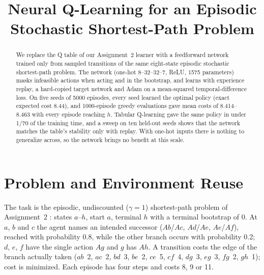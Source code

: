 \documentclass[conference]{IEEEtran}
\begin{document}
\title{Neural Q-Learning for an Episodic\\Stochastic Shortest-Path Problem}

\author{
}

\maketitle

\begin{abstract}
We replace the Q table of our Assignment~2 learner with a feedforward network trained only
from sampled transitions of the same eight-state episodic stochastic shortest-path problem.
The network (one-hot 8--32--32--7, ReLU, 1575 parameters) masks infeasible actions when acting
and in the bootstrap, and learns with experience replay, a hard-copied target network and Adam
on a mean-squared temporal-difference loss. On five seeds of 5000 episodes, every seed learned
the optimal policy (exact expected cost 8.44), and 1000-episode greedy evaluations gave mean
costs of 8.414--8.463 with every episode reaching $h$. Tabular Q-learning gave the same policy
in under 1/70 of the training time, and a sweep on ten held-out seeds shows that the network matches
the table's stability only with replay. With one-hot inputs there is nothing to generalize
across, so the network brings no benefit at this scale.
\end{abstract}

\section{Problem and Environment Reuse}
The task is the episodic, undiscounted ($\gamma=1$) shortest-path problem of Assignment~2
\cite{a2}: states $a$--$h$, start $a$, terminal $h$ with a terminal bootstrap of 0. At $a$,
$b$ and $c$ the agent names an intended successor ($\mathit{Ab}$/$\mathit{Ac}$,
$\mathit{Ad}$/$\mathit{Ae}$, $\mathit{Ae}$/$\mathit{Af}$), reached with probability 0.8,
while the other branch occurs with probability 0.2; $d$, $e$, $f$ have the single action
$\mathit{Ag}$ and $g$ has $\mathit{Ah}$. A transition costs the edge of the branch actually
taken ($\mathit{ab}$~2, $\mathit{ac}$~2, $\mathit{bd}$~3, $\mathit{be}$~2, $\mathit{ce}$~5,
$\mathit{cf}$~4, $\mathit{dg}$~3, $\mathit{eg}$~3, $\mathit{fg}$~2, $\mathit{gh}$~1); cost
is minimized. Each episode has four steps and costs 8, 9 or 11.
\end{document}

